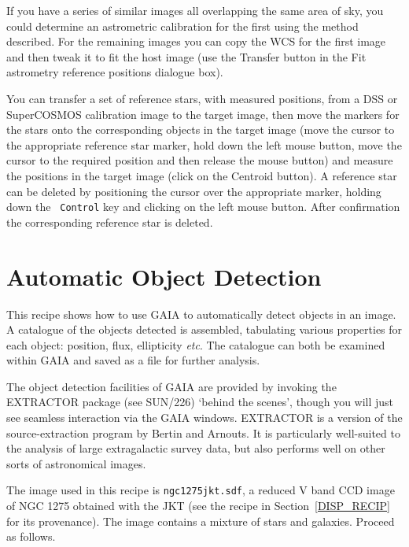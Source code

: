 \documentclass[twoside,11pt]{article}
\newcommand{\xref}[3]{#1}
\newcommand{\xlabel}[1]{}
\renewcommand{\_}{\texttt{\symbol{95}}}
\begin{document}
If you have a series of similar images all overlapping the same area of
sky, you could determine an astrometric calibration for the first using the
method described.  For the remaining images you can copy the WCS for the
first image and then tweak it to fit the host image (use the {\sf Transfer}
button in the {\sf Fit astrometry reference positions} dialogue box).

You can transfer a set of reference stars, with measured positions, from
a DSS or SuperCOSMOS calibration image to the target image, then move
the markers for the stars onto the corresponding objects in the target
image (move the cursor to the appropriate reference star marker, hold down
the left mouse button, move the cursor to the required position and then
release the mouse button) and measure the positions in the target image
(click on the {\sf Centroid} button).  A reference star can be deleted by
positioning the cursor over the appropriate marker, holding down the {\tt
Control} key and clicking on the left mouse button.  After confirmation
the corresponding reference star is deleted.


\newpage
\section{\xlabel{OBJDET_RECIP}\label{OBJDET_RECIP}Automatic Object
Detection}

This recipe shows how to use GAIA to automatically detect objects in an
image.  A catalogue of the objects detected is assembled, tabulating
various properties for each object: position, flux, ellipticity \emph{etc}.
The catalogue can both be examined within GAIA and saved as a file for
further analysis.

The object detection facilities of GAIA are provided by invoking the
EXTRACTOR package (see \xref{SUN/226}{sun226}{}\cite{SUN226}) `behind the
scenes', though you will just see seamless interaction via the GAIA
windows.  EXTRACTOR is a version of the source-extraction program by
Bertin and Arnouts\cite{BERTIN96}.  It is particularly well-suited to the
analysis of large extragalactic survey data, but also performs well on
other sorts of astronomical images.

The image used in this recipe is {\tt ngc1275jkt.sdf}, a reduced V band
CCD image of NGC 1275 obtained with the JKT (see the recipe in
Section~\ref{DISP_RECIP} for its provenance).  The image contains a mixture
of stars and galaxies.  Proceed as follows.
\end{document}

